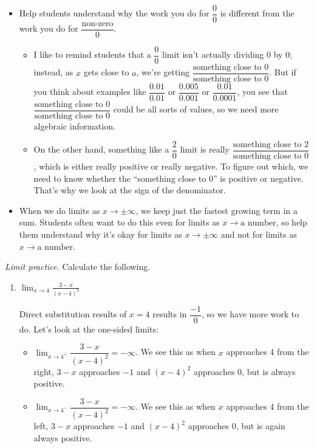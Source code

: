\documentclass{article}
\begin{document}
\begin{enumerate}
\begin{workshop}
\begin{itemize}
    \item Help students understand why the work you do for $\dfrac{0}{0}$ is different from the work you do for $\dfrac{\text{non-zero}}{0}$.
      \begin{itemize}
      \item I like to remind students that a $\dfrac{0}{0}$ limit isn't actually dividing 0 by 0; instead, as $x$ gets close to $a$, we're getting $\dfrac{\text{something close to 0}}{\text{something close to 0}}$. But if you think about examples like $\dfrac{0.01}{0.01}$ or $\dfrac{0.005}{0.001}$ or $\dfrac{0.01}{0.0001}$, you see that $\dfrac{\text{something close to 0}}{\text{something close to 0}}$ could be all sorts of values, so we need more algebraic information.
      \item On the other hand, something like a $\dfrac{2}{0}$ limit is really $\dfrac{\text{something close to 2}}{\text{something close to 0}}$, which is either really positive or really negative. To figure out which, we need to know whether the ``something close to 0'' is positive or negative. That's why we look at the sign of the denominator. 
      \end{itemize}

    \item When we do limits as $x \to \pm \infty$, we keep just the fastest growing term in a sum. Students often want to do this even for limits as $x \to \text{a number}$, so help them understand why it's okay for limits as $x \to \pm \infty$ and not for limits as $x \to \text{a number}$. 
    \end{itemize}
  \end{workshop}

  \emph{Limit practice.} Calculate the following.

  \begin{enumerate} 

  \item
    \begin{problem}[\vfill]
      $\displaystyle \lim_{x \rightarrow 4 } \frac{3-x}{(x-4)^2}$
    \end{problem}

\begin{solution}
    Direct substitution results of $x=4$ results in $\dfrac{-1}{0}$, so we have more work to do. Let's look at the one-sided limits:
    \begin{itemize}
        \item $\displaystyle\lim_{x\to4^+} \dfrac{3-x}{(x-4)^2}  = - \infty$. We see this as when $x$ approaches 4 from the right, $3-x$ approaches $-1$ and $(x-4)^2$ approaches 0, but is always positive. 
    \item $\displaystyle\lim_{x\to4^-} \dfrac{3-x}{(x-4)^2}  = - \infty$. We see this as when $x$ approaches 4 from the left, $3-x$ approaches $-1$ and $(x-4)^2$ approaches 0, but is again always positive. 
    \end{itemize}
\end{solution}


\end{enumerate}
\end{enumerate}
\end{document}
